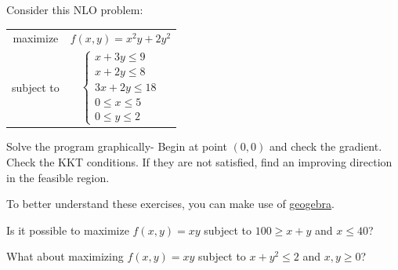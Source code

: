 \documentclass[c]{beamer}
\begin{document}
\begin{frame}


  \begin{Exercise}
     Consider this NLO problem\cite{carter}:
    \begin{center}
     \begin{tabular}{cc}
      maximize & $f(x,y)=x^2y+2y^2$ \\
      subject to & $\begin{cases}x+3y\leq 9\\x+2y\leq 8\\3x+2y\leq 18\\0\leq x \leq 5\\0\leq y \leq 2\end{cases}$
    \end{tabular}
  \end{center}
    Solve the program graphically- Begin at point $(0,0)$ and check the gradient. Check the KKT conditions. If they are not satisfied, find an improving direction in the feasible region.
  \end{Exercise}

\end{frame}

\begin{frame}
  To better understand these exercises, you can make use of \href{https://www.geogebra.org/3d?lang=en}{geogebra}.
\begin{Exercise}
  Is it possible to maximize $f(x,y)=xy$ subject to $100 \geq x+y$ and $x\leq 40$?
\end{Exercise}
\begin{Exercise}
  What about maximizing $f(x,y)=xy$ subject to $x+y^2\leq 2$ and $x,y \geq 0$?
\end{Exercise}
\end{frame}



\end{document}
